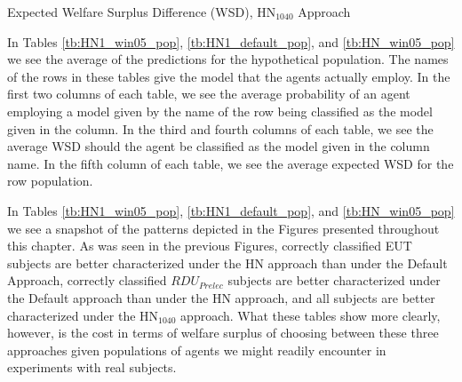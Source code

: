 \documentclass[../main.tex]{subfiles}
\begin{document}
{\begin{table}[h!] %
	\centering
	\caption{Expected Welfare Surplus Difference (WSD), $\text{HN}_{1040}$ Approach}
	\label{tb:HN_win05_pop}
	\begin{adjustbox}{}
	\end{adjustbox}
\end{table}
}

In Tables \ref{tb:HN1_win05_pop}, \ref{tb:HN1_default_pop}, and \ref{tb:HN_win05_pop} we see the average of the predictions for the hypothetical population.
The names of the rows in these tables give the model that the agents actually employ.
In the first two columns of each table, we see the average probability of an agent employing a model given by the name of the row being classified as the model given in the column.
In the third and fourth columns of each table, we see the average WSD should the agent be classified as the model given in the column name.
In the fifth column of each table, we see the average expected WSD for the row population.

In Tables \ref{tb:HN1_win05_pop}, \ref{tb:HN1_default_pop}, and \ref{tb:HN_win05_pop} we see a snapshot of the patterns depicted in the Figures presented throughout this chapter.
As was seen in the previous Figures, correctly classified EUT subjects are better characterized under the HN approach than under the Default Approach, correctly classified $\mathit{RDU_{Prelec}}$ subjects are better characterized under the Default approach than under the HN approach, and all subjects are better characterized under the $\text{HN}_{1040}$ approach.
What these tables show more clearly, however, is the cost in terms of welfare surplus of choosing between these three approaches given populations of agents we might readily encounter in experiments with real subjects.
\end{document}

